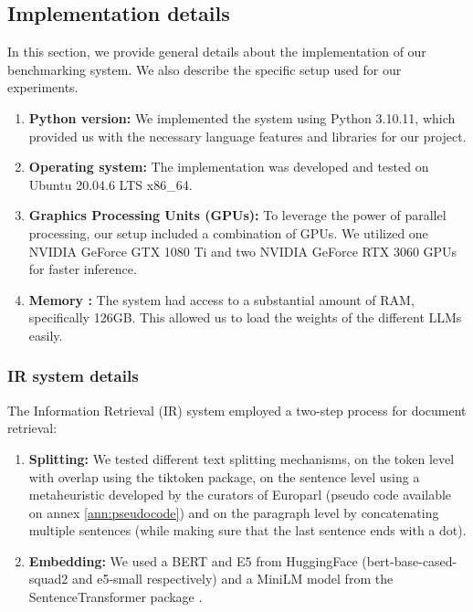 \documentclass[a4paper,12pt]{article}
\begin{document}
\subsection{Implementation details}

In this section, we provide general details about the implementation of our benchmarking system. 
We also describe the specific setup used for our experiments.

\begin{enumerate}
	\item \textbf{Python version:} We implemented the system using Python 3.10.11, which provided us with the necessary language features and libraries for our project.
	\item \textbf{Operating system:} The implementation was developed and tested on Ubuntu 20.04.6 LTS x86\_64.
	\item \textbf{Graphics Processing Units (GPUs):} To leverage the power of parallel processing, our setup included a combination of GPUs. We utilized one NVIDIA GeForce GTX 1080 Ti and two NVIDIA GeForce RTX 3060 GPUs for faster inference.
	\item \textbf{Memory :} The system had access to a substantial amount of RAM, specifically 126GB. This allowed us to load the weights of the different LLMs easily.
\end{enumerate}

\subsubsection*{IR system details}
The Information Retrieval (IR) system employed a two-step process for document retrieval:

\begin{enumerate}
	\item \textbf{Splitting:} We tested different text splitting mechanisms, on the token level with overlap using the tiktoken package, 
    on the sentence level using a metaheuristic developed by the curators of Europarl \cite{europarl} (pseudo code available on annex \ref{ann:pseudocode}) and on the paragraph level by concatenating multiple sentences (while making sure that the last sentence ends with a dot).
	
    \item \textbf{Embedding:} We used a BERT \cite{bert} and E5 \cite{e5} from HuggingFace \cite{huggingface} (bert-base-cased-squad2 and e5-small respectively) and a MiniLM \cite{minilm} model from the SentenceTransformer package \cite{sbert}.
\end{enumerate}
\end{document}
